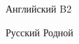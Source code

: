 
\begin{cvskills}

  \cvskill
    {Английский} %
    {B2} %

  \cvskill
    {Русский} %
    {Родной} %

\end{cvskills}
